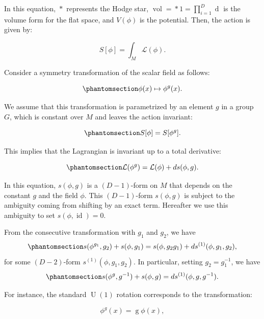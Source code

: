 \documentclass[
  letterpaper,
  DIV=11,
  numbers=noendperiod]{scrreport}
\DeclareMathOperator{\vol}{vol}
\DeclareMathOperator{\U}{U}
\DeclareMathOperator{\id}{id}
\newcommand{\stdim}{D}
\begin{document}
In this equation, \(\mathop{*}\) represents the Hodge star,
\(\vol = \mathop{*} 1 = \prod_{i=1}^{\stdim} \mathop{dx_i}\) is the
volume form for the flat space, and \(V(\phi)\) is the potential. Then,
the action is given by:

\[
S[\phi] = \int_{M}\mathcal{L}(\phi).
\]

Consider a symmetry transformation of the scalar field as follows:

\begin{equation}\phantomsection\label{eq-scalar-transf}{
\phi(x) \mapsto \phi^g(x).
}\end{equation}

We assume that this transformation is parametrized by an element \(g\)
in a group \(G\), which is constant over \(M\) and leaves the action
invariant:

\begin{equation}\phantomsection\label{eq-action-inv}{
S[\phi]=S[\phi^g].
}\end{equation}

This implies that the Lagrangian is invariant up to a total derivative:

\begin{equation}\phantomsection\label{eq-Lagrangian-inv}{
\mathcal{L}(\phi^g) = \mathcal{L}(\phi) + \mathop{ds}(\phi,g).
}\end{equation}

In this equation, \(s(\phi,g)\) is a \((\stdim-1)\)-form on \(M\) that
depends on the constant \(g\) and the field \(\phi\). This
\((D-1)\)-form \(s(\phi,g)\) is subject to the ambiguity coming from
shifting by an exact term. Hereafter we use this ambiguity to set
\(s(\phi,\id)=0\).

From the consecutive transformation with \(g_1\) and \(g_2\), we have
\begin{equation}\phantomsection\label{eq-surface-term-assosiative}{ 
s(\phi^{g_1},g_2) + s(\phi,g_1) = s(\phi,g_2g_1) + ds^{(1)}(\phi,g_1,g_2),
}\end{equation} for some \((D-2)\)-form \(s^{(1)}(\phi,g_1,g_2)\). In
particular, setting \(g_2=g_1^{-1}\), we have
\begin{equation}\phantomsection\label{eq-surface-term-inverse}{s(\phi^g,g^{-1}) + s(\phi,g)  = ds^{(1)}(\phi, g, g^{-1}).
}\end{equation}

For instance, the standard \(\U(1)\) rotation corresponds to the
transformation:

\[
\phi^g(x) = \mathop{g} \phi(x),
\]
\end{document}
